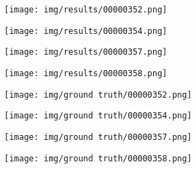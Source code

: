 \documentclass[conference]{IEEEtran}
\begin{document}
    \begin{figure*}[htbp]
        \centering

        \begin{subfigure}[b]{0.22\linewidth}
            \centering
            \texttt{[image: img/results/00000352.png]}
            \caption{}
            \label{res:3:352}
        \end{subfigure}
        \hfill
        \begin{subfigure}[b]{0.22\linewidth}
            \centering
            \texttt{[image: img/results/00000354.png]}
            \caption{}
            \label{res:3:354}
        \end{subfigure}
        \hfill
        \begin{subfigure}[b]{0.22\linewidth}
            \centering
            \texttt{[image: img/results/00000357.png]}
            \caption{}
            \label{res:3:357}
        \end{subfigure}
        \hfill
        \begin{subfigure}[b]{0.22\linewidth}
            \centering
            \texttt{[image: img/results/00000358.png]}
            \caption{}
            \label{res:3:358}
        \end{subfigure}

        \begin{subfigure}[b]{0.22\linewidth}
            \centering
            \texttt{[image: img/ground truth/00000352.png]}
            \caption{}
            \label{res:3:352:gt}
        \end{subfigure}
        \hfill
        \begin{subfigure}[b]{0.22\linewidth}
            \centering
            \texttt{[image: img/ground truth/00000354.png]}
            \caption{}
            \label{res:3:354:gt}
        \end{subfigure}
        \hfill
        \begin{subfigure}[b]{0.22\linewidth}
            \centering
            \texttt{[image: img/ground truth/00000357.png]}
            \caption{}
            \label{res:3:357:gt}
        \end{subfigure}
        \hfill
        \begin{subfigure}[b]{0.22\linewidth}
            \centering
            \texttt{[image: img/ground truth/00000358.png]}
            \caption{}
            \label{res:3:358:gt}
        \end{subfigure}


\end{figure*}
\end{document}
